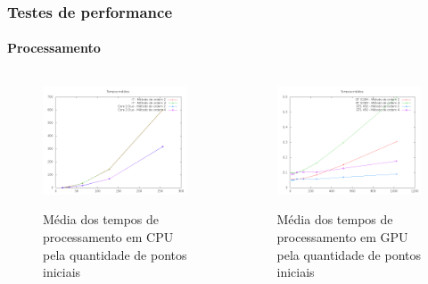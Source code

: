 \documentclass[brazil, 10pt]{beamer}
\begin{document}
\begin{frame}
  \frametitle{Testes de performance}
  \framesubtitle{Processamento}
  
  \begin{columns}
    \begin{column}{.5\textwidth}
      \begin{figure}[!h]
        \begin{center}
          \includegraphics[width=1.1\textwidth, height=.7\textwidth]{img/cpu-means.png}
          \label{fig:cpu-means}
          \caption{Média dos tempos de processamento em CPU pela quantidade de pontos iniciais}
        \end{center}
      \end{figure}
    \end{column}
    \begin{column}{.5\textwidth}
      \begin{figure}[!h]
        \begin{center}
          \includegraphics[width=1.1\textwidth, height=.7\textwidth]{img/gpu-means-double.png}
          \label{fig:cpu-means}
          \caption{Média dos tempos de processamento em GPU pela quantidade de pontos iniciais}
        \end{center}
      \end{figure}
    \end{column}
  \end{columns}
\end{frame}
\end{document}
